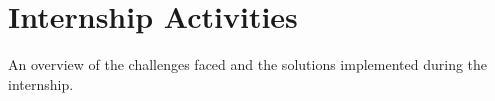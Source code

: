 \chapter{Internship Activities}
An overview of the challenges faced and the solutions implemented during the internship.





